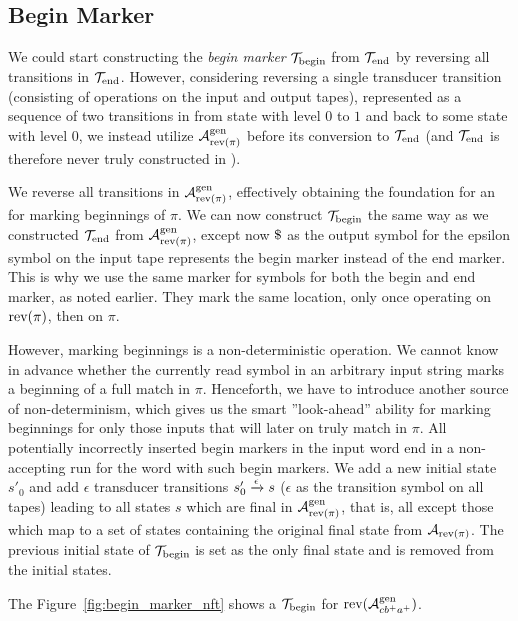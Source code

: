 \subsection{Begin Marker \nft}

We could start constructing the \emph{begin marker} \nft $\mathcal{T}_{\text{begin}}$ from $\mathcal{T}_{\text{end}}$ by reversing all transitions in $\mathcal{T}_{\text{end}}$.
However, considering reversing a single transducer transition (consisting of operations on the input and output tapes), represented as a sequence of two \nfa transitions in \mata from state with level $0$ to $1$ and back to some state with level $0$, we instead utilize $\mathcal{A}^{\text{gen}}_{\text{rev(}\pi\text{)}}$ before its conversion to $\mathcal{T}_{\text{end}}$ (and $\mathcal{T}_{\text{end}}$ is therefore never truly constructed in \mata).

We reverse all transitions in $\mathcal{A}^{\text{gen}}_{\text{rev(}\pi\text{)}}$, effectively obtaining the foundation for an \nfa for marking beginnings of $\pi$.
We can now construct $\mathcal{T}_{\text{begin}}$ the same way as we constructed $\mathcal{T}_{\text{end}}$ from $\mathcal{A}^{\text{gen}}_{\text{rev(}\pi\text{)}}$, except now $\marker$ as the output symbol for the epsilon symbol on the input tape represents the begin marker instead of the end marker.
This is why we use the same marker for symbols for both the begin and end marker, as noted earlier.
They mark the same location, only once operating on $\text{rev(}\pi\text{)}$, then on $\pi$.

However, marking beginnings is a non-deterministic operation.
We cannot know in advance whether the currently read symbol in an arbitrary input string marks a beginning of a full match in $\pi$.
Henceforth, we have to introduce another source of non-determinism, which gives us the smart ''look-ahead'' ability for marking beginnings for only those inputs that will later on truly match in $\pi$.
All potentially incorrectly inserted begin markers in the input word end in a non-accepting run for the word with such begin markers.
We add a new initial state $s'_0$ and add $\epsilon$ transducer transitions ${s'_0} \xrightarrow{{\epsilon}} {s}$ ($\epsilon$ as the transition symbol on all tapes) leading to all states $s$ which are final in $\mathcal{A}^{\text{gen}}_{\text{rev(}\pi\text{)}}$, that is, all except those which map to a set of states containing the original final state from $\mathcal{A}_{\text{rev(}\pi\text{)}}$.
The previous initial state of $\mathcal{T}_{\text{begin}}$ is set as the only final state and is removed from the initial states.

The Figure~\ref{fig:begin_marker_nft} shows a $\mathcal{T}_{\text{begin}}$ for $\text{rev(}\mathcal{A}^{\text{gen}}_{cb^+a^+}\text{)}$.

